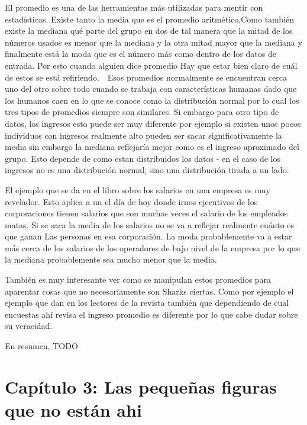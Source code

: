 \documentclass[a4paper, 11pt]{article}
\begin{document}
El promedio es una de las herramientas más utilizadas para mentir con estadísticas. Existe tanto la media que es el promedio aritmético,Como también existe la mediana qué parte del grupo en dos de tal manera que la mitad de los números usados es menor que la mediana y la otra mitad mayor que la mediana y finalmente está la moda que es el número más como dentro de los datos de entrada. Por esto cuando alguien dice promedio Hay que estar bien claro de cuál de estos se está refiriendo.  Esos promedios normalmente se encuentran cerca uno del otro sobre todo cuando se trabaja con características humanas dado que los humanos caen en lo que se conoce como la distribución normal por lo cual los tres tipos de promedios siempre son similares. Si embargo para otro tipo de datos, los ingresos esto puede ser muy diferente por ejemplo si existen unos pocos individuos con ingresos realmente alto pueden ser sacar significativamente la media sin embargo la mediana reflejaría mejor como es el ingreso aproximado del grupo. Esto depende de como estan distribuidos los datos - en el caso de los ingresos no es una distribución normal, sino una distribución tirada a un lado.

El ejemplo que se da en el libro sobre los salarios en una empresa es muy revelador. Esto aplica a un el día de hoy donde irnos ejecutivos de los corporaciones tienen salarios que son muchas veces el salario de los empleados matas. Si se saca la media de los salarios no se va a reflejar realmente cuánto es que ganan Las personas en esa corporación. La moda probablemente va a estar más cerca de los salarios de los operadores de bajo nivel de la empresa por lo que la mediana probablemente sea mucho menor que la media.

También es muy interesante ver como se manipulan estos promedios para aparentar cosas que no necesariamente son Sharks ciertas. Como por ejemplo el ejemplo que dan en los lectores de la revista también que dependiendo de cual encuestas ahí revisa el ingreso promedio es diferente por lo que cabe dudar sobre su veracidad.

En resumen, TODO

\section*{Capítulo 3: Las pequeñas figuras que no están ahi}
\end{document}
